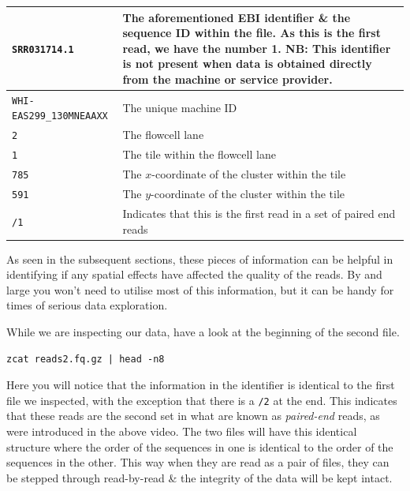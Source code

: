 \begin{tabular}{|p{5cm} | p{9cm} |}
  \hline
  \texttt{SRR031714.1} & The aforementioned EBI identifier \& the sequence ID within the file. As this is the first read, we have the number 1. NB: This identifier is \textbf{not} present when data is obtained directly from the machine or service provider.\\
  \hline
  \texttt{WHI-EAS299\_130MNEAAXX} & The unique machine ID \\
  \hline
  \texttt{2} & The flowcell lane \\
  \hline
  \texttt{1} & The tile within the flowcell lane \\
  \hline
  \texttt{785} & The $x$-coordinate of the cluster within the tile \\
  \hline
  \texttt{591} & The $y$-coordinate of the cluster within the tile \\
  \hline
  \texttt{/1} & Indicates that this is the first read in a set of paired end reads \\
  \hline
\end{tabular}

As seen in the subsequent sections, these pieces of information can be helpful in identifying if any spatial effects have affected the quality of the reads.
By and large you won't need to utilise most of this information, but it can be handy for times of serious data exploration.\\

\begin{steps}
While we are inspecting our data, have a look at the beginning of the second file.
\begin{lstlisting}
zcat reads2.fq.gz | head -n8
\end{lstlisting}
Here you will notice that the information in the identifier is identical to the first file we inspected, with the exception that there is a \texttt{/2} at the end.
This indicates that these reads are the second set in what are known as \textit{paired-end} reads, as were introduced in the above video.
The two files will have this identical structure where the order of the sequences in one is identical to the order of the sequences in the other.
This way when they are read as a pair of files, they can be stepped through read-by-read \& the integrity of the data will be kept intact.
\end{steps}

